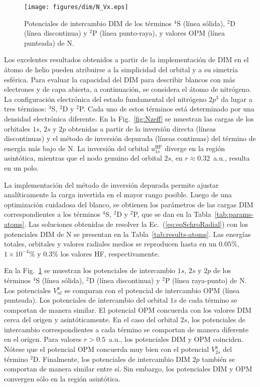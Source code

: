 \begin{figure}[t]
\centering
\texttt{[image: figures/dim/N\_Vx.eps]}
\caption[Potenciales de intercambio DIM de N.]
{Potenciales de intercambio DIM de los términos $^4$S (línea sólida), 
$^2$D (línea discontinua) y $^2$P (línea punto-raya), y valores OPM 
(línea punteada) de N.}
\label{fig:NVx}
\end{figure}

Los excelentes resultados obtenidos a partir de la implementación de DIM 
en el átomo de helio pueden atribuirse a la simplicidad del orbital y a 
su simetría esférica. Para evaluar la capacidad del DIM para describir 
blancos con más electrones y de capa abierta, a continuación, se 
considera el átomo de nitrógeno. 
La configuración electrónica del estado fundamental del nitrógeno $2p^3$ 
da lugar a tres términos: $^4$S, $^2$D y $^2$P. Cada uno de estos 
términos está determinado por una densidad electrónica diferente. En la 
Fig.~\ref{fig:Nzeff} se muestran las cargas de los orbitales $1s$, $2s$ 
y $2p$ obtenidas a partir de la inversión directa (líneas discontinuas) 
y el método de inversión depurada (líneas continuas) del término de 
energía más bajo de N. La inversión del orbital $u_{1s}^{\mathrm{HF}}$ 
diverge en la región asintótica, mientras que el nodo genuino del 
orbital $2s$, en $r\approx 0.32$~a.u., resulta en un polo. 

La implementación del método de inversión depurada permite ajustar 
analíticamente la carga invertida en el mayor rango posible. Luego de 
una optimización cuidadosa del blanco, se obtienen los parámetros de las 
cargas DIM correspondientes a los términos $^4$S, $^2$D y $^2$P, que se 
dan en la Tabla~\ref{tab:params-atoms}. Las soluciones obtenidas de 
resolver la Ec.~(\ref{eq:eqSchroRadial}) con los potenciales DIM de N 
se presentan en la Tabla~\ref{tab:results-atoms}. Las energías totales, 
orbitales y valores radiales medios se reproducen hasta en un $0.05\%$, 
$1\times 10^{-4}\%$ y $0.3\%$ los valores HF, respectivamente. 

En la Fig.~\ref{fig:NVx} se muestran los potenciales de intercambio 
$1s$, $2s$ y $2p$ de los términos $^4$S (línea sólida), $^2$D (línea 
discontinua) y $^2$P (línea raya-punto) de N. Los potenciales 
$V_{nl}^{\mathrm{x}}$ se comparan con el potencial de intercambio OPM 
(línea punteada). Los potenciales de intercambio del orbital $1s$ de 
cada término se comportan de manera similar. El potencial OPM concuerda 
con los valores DIM cerca del origen y asintóticamente. En el caso del 
orbital $2s$, los potenciales de intercambio correspondientes a cada 
término se comportan de manera diferente en el origen. Para valores 
$r>0.5$~a.u., los potenciales DIM y OPM coinciden. Nótese que el 
potencial OPM concuerda muy bien con el potencial $V_{2s}^{\mathrm{x}}$ 
del término $^2$D. Finalmente, los potenciales de intercambio DIM $2p$ 
también se comportan de manera similar entre sí. Sin embargo, los 
potenciales DIM y OPM convergen sólo en la región asintótica. 

